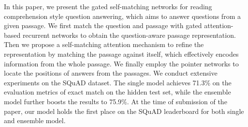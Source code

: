 In this paper, we present the gated self-matching networks for reading comprehension style question answering, which aims to answer questions from a given passage. We first match the question and passage with gated attention-based recurrent networks to obtain the question-aware passage representation. Then we propose a self-matching attention mechanism to refine the representation by matching the passage against itself, which effectively encodes information from the whole passage. We finally employ the pointer networks to locate the positions of answers from the passages. We conduct extensive experiments on the SQuAD dataset. The single model achieves 71.3\% on the evaluation metrics of exact match on the hidden test set, while the ensemble model further boosts the results to 75.9\%. At the time of submission of the paper, our model holds the first place on the SQuAD leaderboard for both single and ensemble model.
